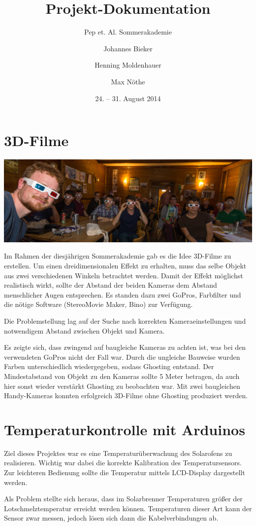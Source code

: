 \documentclass[
  captions=tableheading,  %
  titlepage=false, %
  twocolumn,
  headings=small,
]{scrartcl}
\title{Projekt-Dokumentation}
\subtitle{Pep et. Al. Sommerakademie}
\date{24. -- 31. August 2014}
\author{Johannes Bieker \and Henning Moldenhauer \and Max Nöthe}
\begin{document}
\maketitle
\section*{3D-Filme}
\begin{center}
  \includegraphics[width=\linewidth]{images/3dfilme_panorama.JPG}
\end{center}
Im Rahmen der diesjährigen Sommerakademie gab es die Idee 3D-Filme zu erstellen.
Um einen dreidimensionalen Effekt zu erhalten, muss das selbe Objekt aus zwei verschiedenen Winkeln betrachtet werden.
Damit der Effekt möglichst realistisch wirkt, sollte der Abstand der beiden Kameras dem Abstand menschlicher Augen entsprechen.
Es standen dazu zwei GoPros, Farbfilter und die nötige Software (StereoMovie Maker, Bino) zur Verfügung.

Die Problemstellung lag auf der Suche nach korrekten Kameraeinstellungen und notwendigem Abstand zwischen Objekt und Kamera.

Es zeigte sich, dass zwingend auf baugleiche Kameras zu achten ist, was bei den verwendeten GoPros nicht der Fall war.
Durch die ungleiche Bauweise wurden Farben unterschiedlich wiedergegeben, sodass Ghosting entstand.
Der Mindestabstand von Objekt zu den Kameras sollte 5 Meter betragen, da auch hier sonst wieder verstärkt Ghosting zu beobachten war.
Mit zwei baugleichen Handy-Kameras konnten erfolgreich 3D-Filme ohne Ghosting produziert werden.

\section*{Temperaturkontrolle mit Arduinos}
Ziel dieses Projektes war es eine Temperaturüberwachung des Solarofens zu realisieren.
Wichtig war dabei die korrekte Kalibration des Temperatursensors.
Zur leichteren Bedienung sollte die Temperatur mittels LCD-Display dargestellt werden.

Als Problem stellte sich heraus, dass im Solarbrenner Temperaturen größer der Lotschmelztemperatur erreicht werden können.
Temperaturen dieser Art kann der Sensor zwar messen, jedoch lösen sich dann die Kabelverbindungen ab.
\end{document}
